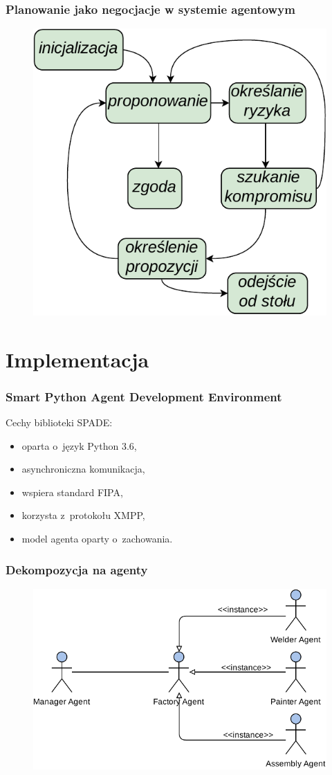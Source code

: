 \documentclass{beamer}
\begin{document}
\begin{frame}
    \frametitle{Planowanie jako negocjacje w systemie agentowym}
    \begin{figure}
        \centering
        \includegraphics[width=0.6\columnwidth]{figures/SAG-Negotiation-Prezentacja.pdf}
        \label{fig:negocjacje}
    \end{figure}
\end{frame}

\section{Implementacja}
\begin{frame}
    \frametitle{Smart Python Agent Development Environment}
    Cechy biblioteki SPADE:
    \begin{itemize}
        \item oparta o~język Python 3.6,
        \item asynchroniczna komunikacja,
        \item wspiera standard FIPA,
        \item korzysta z~protokołu XMPP,
        \item model agenta oparty o~zachowania.
    \end{itemize}
\end{frame}

\begin{frame}
    \frametitle{Dekompozycja na agenty}
    \begin{figure}
        \centering
        \includegraphics[width=0.95\columnwidth]{figures/SAG-Agents.pdf}
        \label{fig:agenci}
    \end{figure}
\end{frame}
\end{document}
